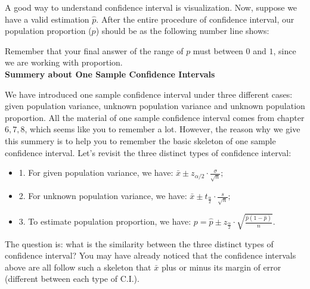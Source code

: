 \noindent
A good way to understand confidence interval is visualization. Now, suppose we have a valid estimation $\hat{p}$. After the entire procedure of confidence interval, our population proportion ($p$) should be as the following number line shows:\\

\begin{center}
\end{center}

\noindent
Remember that your final answer of the range of $p$ must between $0$ and $1$, since we are working with proportion.\\

\noindent
\textbf{Summery about One Sample Confidence Intervals}

\noindent
We have introduced one sample confidence interval under three different cases: given population variance, unknown population variance and unknown population proportion. All the material of one sample confidence interval comes from chapter $6, 7, 8$, which seems like you to remember a lot. However, the reason why we give this summery is to help you to remember the basic skeleton of one sample confidence interval. Let's revisit the three distinct types of confidence interval:

\begin{itemize}
	\item 1. For given population variance, we have: $\bar{x}  \pm z_{ \alpha/2 } \cdot \frac{\sigma}{\sqrt{n}}; $
	\item 2. For unknown population variance, we have: $\bar{x}  \pm t_{\frac{\alpha}{2}} \cdot \frac{s}{\sqrt{n}};$
	\item 3. To estimate population proportion, we have: $p = \hat{p}  \pm z_{\frac{\alpha}{2}} \cdot \sqrt{\frac{\hat{p}(1 - \hat{p})}{n}}.$
\end{itemize}

\noindent
The question is: what is the similarity between the three distinct types of confidence interval? You may have already noticed that the confidence intervals above are all follow such a skeleton that $\bar{x}$ plus or minus its margin of error (different between each type of C.I.).\\ 

